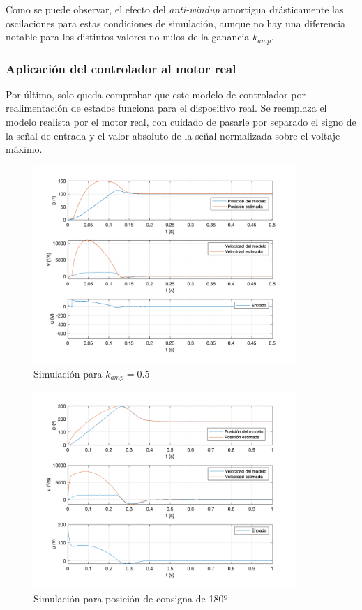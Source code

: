 \documentclass[a4paper, 12pt]{article}
\begin{document}
Como se puede observar, el efecto del \textit{anti-windup} amortigua drásticamente las oscilaciones para estas condiciones de simulación, aunque no hay una diferencia notable para los distintos valores no nulos de la ganancia $k_{amp}$.

\subsubsection{Aplicación del controlador al motor real}
Por último, solo queda comprobar que este modelo de controlador por realimentación de estados funciona para el dispositivo real. Se reemplaza el modelo realista por el motor real, con cuidado de pasarle por separado el signo de la señal de entrada y el valor absoluto de la señal normalizada sobre el voltaje máximo. 
\begin{figure}[H]
	\centering
	\includegraphics*[height = 7.5cm]{figs/p6/kamp05}
	\caption{Simulación para $k_{amp} = 0.5$}
\end{figure}
\begin{figure}[H]
	\centering
	\includegraphics*[height = 7.5cm]{figs/p6/cons180} 
	\caption{Simulación para posición de consigna de 180º} \label{poscos}
\end{figure}
\end{document}
